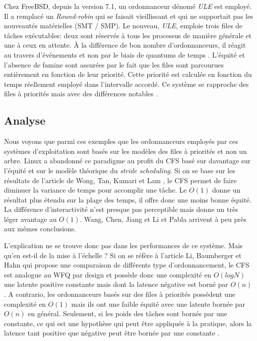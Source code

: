\documentclass[letterpaper]{article}
\begin{document}
Chez FreeBSD, depuis la version 7.1, un ordonnanceur dénomé \textit{ULE} est employé. Il a remplacé un \textit{Round-robin} qui se faisait vieillissant et qui ne supportait pas les nouveautés matérielles (SMT / SMP). Le nouveau, \textit{ULE}, emploie trois files de tâches exécutables: deux sont réservés à tous les processus de manière générale et une à ceux en attente. À la différence de bon nombre d'ordonnanceurs, il réagit au travers d'événements et non par le biais de quantums de temps \citep{roberson2003ule}. L'équité et l'absence de famine sont assurées par le fait que les files sont parcourues entièrement en fonction de leur priorité. Cette priorité est calculée en fonction du temps réellement employé dans l'intervalle accordé. Ce système se rapproche des files à priorités mais avec des différences notables \citep{mckusick2014design}.

\subsection{Analyse}

Nous voyons que parmi ces exemples que les ordonnanceurs employés par ces systèmes d'exploitation sont basés sur les modèles des files à priorités et non un arbre. Linux a abandonné ce paradigme au profit du CFS basé sur davantage sur l'équité et sur le modèle théorique du \textit{stride scheduling}. Si on se base sur les résultats de l'article de Wong, Tan, Kumari et Lam \citep{4631872, Wong:2008:TAF:1400097.1400102}, le CFS permet de faire diminuer la variance de temps pour accomplir une tâche. Le $O(1)$ donne un résultat plus étendu sur la plage des temps, il offre donc une moins bonne équité. La différence d'interactivité n'est presque pas perceptible mais donne un très léger avantage au $O(1)$. Wang, Chen, Jiang et Li \citep{5279631} et Pabla \citep{Pabla:2009:CFS:1594371.1594375} arrivent à peu près aux mêmes conclusions.

L'explication ne se trouve donc pas dans les performances de ce système. Mais qu'en est-il de la mise à l'échelle ? Si on se réfère à l'article Li, Baumberger et Hahn \citep{li2009efficient} qui propose une comparaison de différents type d'ordonnancement, le CFS est analogue au WFQ par design et possède donc une complexité en $O(log N)$ une latente positive constante mais dont la latence négative est borné par $O(n)$ \citep{234856}. A contrario, les ordonnanceurs basés sur des files à priorités possèdent une complexité en $O(1)$ mais ils ont une faible équité avec une latente bornée par $O(n)$ en général. Seulement, si les poids des tâches sont bornés par une constante, ce qui est une hypothèse qui peut être appliquée à la pratique, alors la latence tant positive que négative peut être bornée par une constante \citep{Shreedhar:1995:EFQ:217391.217453}.
\end{document}
